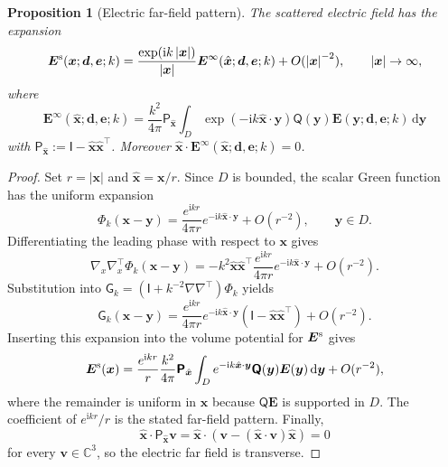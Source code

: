 \documentclass[11pt]{article}
\numberwithin{equation}{section}
\newcommand{\C}{\mathbb{C}}
\newcommand{\ii}{\mathrm{i}}
\newcommand{\dd}{\,\mathrm d}
\newcommand{\vect}[1]{\bm{#1}}
\newcommand{\tens}[1]{\bm{\mathsf{#1}}}
\newcommand{\Id}{\ensuremath{\tens{I}}}
\newcommand{\G}{\ensuremath{\tens{G}}}
\newcommand{\Qt}{\ensuremath{\tens{Q}}}
\newcommand{\abs}[1]{\left\lvert #1\right\rvert}
\theoremstyle{plain}
\newtheorem{proposition}[theorem]{Proposition}
\theoremstyle{definition}
\begin{document}
\begin{proposition}[Electric far-field pattern]\label{prop:farfield}
The scattered electric field has the expansion
\begin{equation*}
  \vect{E}^{\rm s}(\vect{x};\vect{d},\vect{e};k)=\frac{\exp(\ii k\abs{\vect{x}})}{\abs{\vect{x}}}\vect{E}^\infty(\hat{\vect{x}};\vect{d},\vect{e};k)+O(\abs{\vect{x}}^{-2}),
  \qquad \abs{\vect{x}}\to\infty,
\end{equation*}
where
\begin{equation*}
  \vect{E}^\infty(\hat{\vect{x}};\vect{d},\vect{e};k)=\frac{k^2}{4\pi}\tens{P}_{\hat{\vect{x}}}
  \int_D\exp(-\ii k\hat{\vect{x}}\cdot \vect{y})\Qt(\vect{y})\vect{E}(\vect{y};\vect{d},\vect{e};k)\dd \vect{y} 
\end{equation*}
with $\tens{P}_{\hat{\vect{x}}}:=\Id-\hat{\vect{x}}\hat{\vect{x}}^\top$. Moreover $\hat{\vect{x}}\cdot \vect{E}^\infty(\hat{\vect{x}};\vect{d},\vect{e};k)=0$.
\end{proposition}

\begin{proof}
Set \(r=\abs{\vect{x}}\) and \(\hat{\vect{x}}=\vect{x}/r\).  Since \(D\) is bounded, the scalar Green function has the uniform expansion
\[
  \Phi_k(\vect{x}-\vect{y})
  =\frac{e^{\ii kr}}{4\pi r}e^{-\ii k\hat{\vect{x}}\cdot\vect{y}}+O(r^{-2}),
  \qquad \vect{y}\in D .
\]
Differentiating the leading phase with respect to \(\vect{x}\) gives
\[
  \nabla_x\nabla_x^\top \Phi_k(\vect{x}-\vect{y})
  =-k^2\hat{\vect{x}}\hat{\vect{x}}^\top
  \frac{e^{\ii kr}}{4\pi r}e^{-\ii k\hat{\vect{x}}\cdot\vect{y}}+O(r^{-2}).
\]
Substitution into \(\G_k=(\Id+k^{-2}\nabla\nabla^\top)\Phi_k\) yields
\[
  \G_k(\vect{x}-\vect{y})
  =\frac{e^{\ii kr}}{4\pi r}e^{-\ii k\hat{\vect{x}}\cdot\vect{y}}
  (\Id-\hat{\vect{x}}\hat{\vect{x}}^\top)+O(r^{-2}) .
\]
Inserting this expansion into the volume potential for \(\vect{E}^{\rm s}\) gives
\[
  \vect{E}^{\rm s}(\vect{x})
  =\frac{e^{\ii kr}}{r}\frac{k^2}{4\pi}\tens{P}_{\hat{\vect{x}}}
  \int_D e^{-\ii k\hat{\vect{x}}\cdot\vect{y}}\Qt(\vect{y})\vect{E}(\vect{y})\dd\vect{y}
  +O(r^{-2}),
\]
where the remainder is uniform in \(\hat{\vect{x}}\) because \(\Qt\vect{E}\) is supported in \(D\).  The coefficient of \(e^{\ii kr}/r\) is the stated far-field pattern.  Finally,
\[
  \hat{\vect{x}}\cdot \tens{P}_{\hat{\vect{x}}}\vect{v}
  =\hat{\vect{x}}\cdot(\vect{v}-(\hat{\vect{x}}\cdot\vect{v})\hat{\vect{x}})=0
\]
for every \(\vect{v}\in\C^3\), so the electric far field is transverse.
\end{proof}
\end{document}
